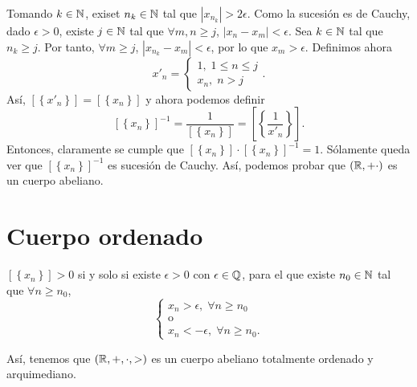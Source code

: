 Tomando $\displaystyle k \in \mathbb{N} $, exiset $\displaystyle n_{k} \in \mathbb{N} $ tal que $\displaystyle \left|x_{n_{k}}\right| > 2\epsilon  $. Como la sucesión es de Cauchy, dado $\displaystyle \epsilon > 0 $, existe $\displaystyle j \in \mathbb{N} $ tal que $\displaystyle \forall m,n \geq j $, $\displaystyle \left|x_{n}-x_{m}\right| < \epsilon  $. Sea $\displaystyle k \in \mathbb{N} $ tal que $\displaystyle n_{k} \geq j $. Por tanto, $\displaystyle \forall m \geq j $, $\displaystyle \left|x_{n_{k}}-x_{m}\right| < \epsilon  $, por lo que $\displaystyle x_{m} > \epsilon  $. Definimos ahora
\[x'_{n} = 
\begin{cases}
1, \; 1 \leq n \leq j \\
x_{n}, \; n > j
\end{cases}
.\]
Así, $\displaystyle [ \left\{ x'_{n}\right\}] = [ \left\{ x_{n}\right\}]  $ y ahora podemos definir
\[[ \left\{ x_{n}\right\}] ^{-1} = \frac{1}{[ \left\{ x_{n}\right\}] } = \left[ \left\{ \frac{1}{x'_{n}}\right\}\right]  .\]
Entonces, claramente se cumple que $\displaystyle [ \left\{ x_{n}\right\}] \cdot [ \left\{ x_{n}\right\}] ^{-1} = 1 $. Sólamente queda ver que $\displaystyle [ \left\{ x_{n}\right\}] ^{-1} $ es sucesión de Cauchy.
Así, podemos probar que $\displaystyle \left(\mathbb{R}, + \cdot\right) $ es un cuerpo abeliano.

\section{Cuerpo ordenado}

\begin{fdefinition}[]
\normalfont $\displaystyle [ \left\{ x_{n}\right\}] > 0 $ si y solo si existe $\displaystyle \epsilon > 0 $ con $\displaystyle \epsilon \in \mathbb{Q} $, para el que existe $\displaystyle n_{0} \in \mathbb{N} $ tal que $\displaystyle \forall n \geq n_{0} $, 
\[
\begin{cases}
x_{n} > \epsilon, \; \forall n\geq n_{0} \\
\text{o} \\
x_{n} < -\epsilon, \; \forall n\geq n_{0}.
\end{cases}
\]
\end{fdefinition}

Así, tenemos que $\displaystyle \left(\mathbb{R}, + , \cdot, >\right) $ es un cuerpo abeliano totalmente ordenado y arquimediano. 

